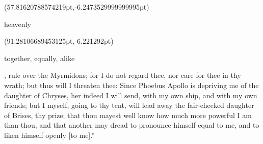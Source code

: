 \documentclass{ransom}
\begin{document}
\begin{foreignpage}
{\begin{textblock*}{51.05377pt}(57.81620788574219pt,\pdfpageheight-152.37759399414062pt-6.2473529999999995pt)\parbox[b]{51.05377pt}{\begin{blacktext}\begin{latin}heavenly\end{latin}\end{blacktext}}\end{textblock*}
\begin{textblock*}{26.55093pt}(91.28106689453125pt,\pdfpageheight-125.37759399414062pt-6.221292pt)\parbox[b]{26.55093pt}{\begin{blacktext}\begin{latin}together, equally, alike\end{latin}\end{blacktext}}\end{textblock*}
 }
\end{foreignpage}


, rule over the
Myrmidons; for I do not regard thee, nor care for thee in thy wrath;
but thus will I threaten thee: Since Phoebus Apollo is depriving me of
the daughter of Chryses, her indeed I will send, with my own ship,
and with my own friends; but I myself, going to thy tent, will lead
away the fair-cheeked daughter of Brises, thy prize; that thou
mayest well know how much more powerful I am than thou, and that
another may dread to pronounce himself equal to me, and to liken
himself openly [to me].”
\end{document}

